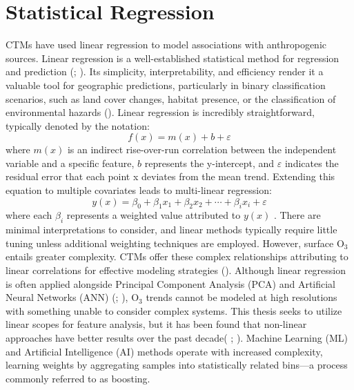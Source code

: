 \section{Statistical Regression} \label{litreview:sm} CTMs have used linear regression to model associations with anthropogenic sources. Linear regression is a well-established statistical method for regression and prediction (\cite{sun_prediction_2015}; \cite{wang_combining_2016}). Its simplicity, interpretability, and efficiency render it a valuable tool for geographic predictions, particularly in binary classification scenarios, such as land cover changes, habitat presence, or the classification of environmental hazards (\cite{starbuck_linear_2023}). Linear regression is incredibly straightforward, typically denoted by the notation:
\[
f(x) = m(x) + b + \varepsilon
\]
where $m(x)$ is an indirect rise-over-run correlation between the independent variable and a specific feature, $b$ represents the y-intercept, and $\varepsilon$ indicates the residual error that each point x deviates from the mean trend. Extending this equation to multiple covariates leads to multi-linear regression:
\[
y(x) = \beta_0 + \beta_1 x_1 + \beta_2 x_2 + \cdots + \beta_i x_i + \varepsilon
\]
where each $\beta_i$ represents a weighted value attributed to $y(x)$ \cite{starbuck_linear_2023}. There are minimal interpretations to consider, and linear methods typically require little tuning unless additional weighting techniques are employed. However, surface O$_3$ entails greater complexity. CTMs offer these complex relationships attributing to linear correlations for effective modeling strategies (\cite{napi_different_2023}). Although linear regression is often applied alongside Principal Component Analysis (PCA) and Artificial Neural Networks (ANN) (\cite{moustris_application_2012}; \cite{sun_prediction_2015}), O$_3$ trends cannot be modeled at high resolutions with something unable to consider complex systems. This thesis seeks to utilize linear scopes for feature analysis, but it has been found that non-linear approaches have better results over the past decade( \cite{cavaliere_development_2023}; \cite{li_development_2024}). Machine Learning (ML) and Artificial Intelligence (AI) methods operate with increased complexity, learning weights by aggregating samples into statistically related bins—a process commonly referred to as boosting.
